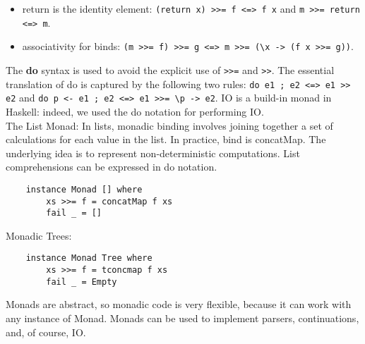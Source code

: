 \begin{itemize}
	\item return is the identity element: \texttt{(return x) >>= f <=> f x} and \texttt{m >>= return <=> m}.
	\item associativity for binds: \texttt{(m >>= f) >>= g <=> m >>= (\textbackslash x -> (f x >>= g))}.
\end{itemize}
The \textbf{do} syntax is used to avoid the explicit use of \texttt{>>=} and \texttt{>>}.
The essential translation of do is captured by the following two rules: \texttt{do e1 ; e2 <=> e1 >> e2} and \texttt{do p <- e1 ; e2 <=> e1 >>= \textbackslash p -> e2}.
IO is a build-in monad in Haskell: indeed, we used the do notation for performing IO.\\
The List Monad:
In lists, monadic binding involves joining together a set of calculations for each value in the list.
In practice, bind is concatMap.
The underlying idea is to represent non-deterministic computations.
List comprehensions can be expressed in do notation.
\begin{lstlisting}
	instance Monad [] where
		xs >>= f = concatMap f xs
		fail _ = []
\end{lstlisting}
Monadic Trees:
\begin{lstlisting}
	instance Monad Tree where
		xs >>= f = tconcmap f xs
		fail _ = Empty
\end{lstlisting}
Monads are abstract, so monadic code is very flexible, because it can work with any instance of Monad.
Monads can be used to implement parsers, continuations, and, of course, IO.

